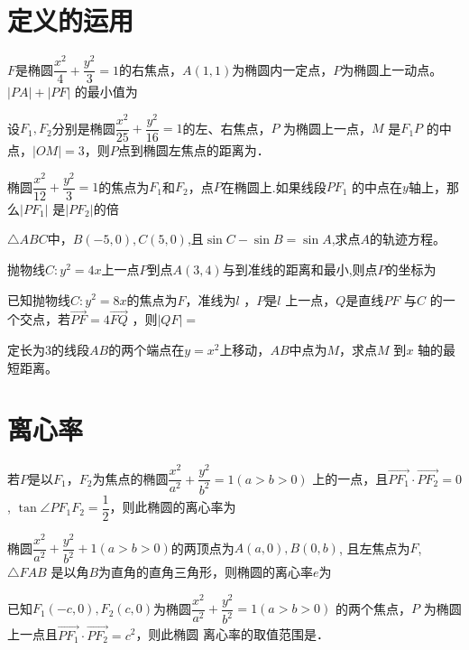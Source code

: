 \documentclass{article}
\begin{document}
\section{定义的运用}
    \question $F$是椭圆$\dfrac{x^2}{4}+\dfrac{y^2}{3}=1$的右焦点，$A(1,1)$为椭圆内一定点，$P$为椭圆上一动点。$|PA|+|PF|$ 的最小值为\lines %

    \question 设$F_1,F_2$分别是椭圆$\dfrac{x^2}{25}+\dfrac{y^2}{16}=1$的左、右焦点，$P$ 为椭圆上一点，$M$ 是$F_1P$ 的中点，$|OM|=3$，则$P$点到椭圆左焦点的距离为\lines．

    \question 椭圆$\dfrac{x^2}{12}+\dfrac{y^2}{3}=1$的焦点为$F_1$和$F_2$，点$P$在椭圆上.如果线段$PF_1$ 的中点在$y$轴上，那么$|PF_1|$ 是$|PF_2|$的\lines 倍

 \question $\triangle ABC$中，$B(-5,0),C(5,0)$,且$\sin C-\sin B= \sin A$,求点$A$的轨迹方程。

    \question 抛物线$C: y^2=4x$上一点$P$到点$A(3,4)$与到准线的距离和最小,则点$P$的坐标为\lines

    \question[2014全国 ]已知抛物线$C: y^2=8x$的焦点为$F$，准线为$l$ ，$P$是$l$ 上一点，$Q$是直线$PF$ 与$C$ 的一个交点，若$\overrightarrow{PF}=4\overrightarrow{FQ}$ ，则$|QF|=$\lines

    \question[*]定长为$3$的线段$AB$的两个端点在$y=x^2$上移动，$AB$中点为$M$，求点$M$ 到$x$ 轴的最短距离。%

\section{离心率}

    \question 若$P$是以$F_1，F_2$为焦点的椭圆$\dfrac{x^2}{a^2}+\dfrac{y^2}{b^2}=1(a>b>0)$ 上的一点，且$\overrightarrow{PF_1}\cdot\overrightarrow{PF_2}=0$, $\tan\angle PF_1F_2=\dfrac12$，则此椭圆的离心率为\lines

    \question 椭圆$\dfrac{x^2}{a^2}+\dfrac{y^2}{b^2}+1(a>b>0)$的两顶点为$A(a,0), B(0,b)$, 且左焦点为$F$, $\triangle FAB$ 是以角$B$为直角的直角三角形，则椭圆的离心率$e$为\lines

    \question 已知$F_1(-c,0),F_2(c,0)$为椭圆$\dfrac{x^2}{a^2}+\dfrac{y^2}{b^2}=1(a>b>0)$ 的两个焦点，$P$ 为椭圆上一点且$\overrightarrow{PF_1}\cdot \overrightarrow{PF_2}=c^2$，则此椭圆 离心率的取值范围是\lines．
\end{document}
